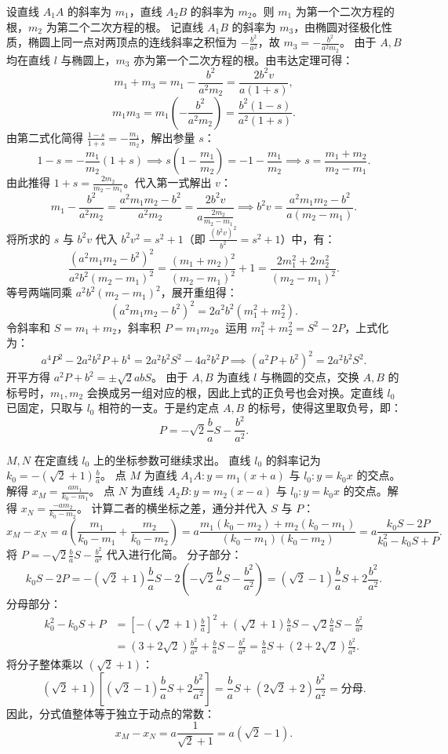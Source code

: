 \begin{solution}
设直线 $A_1A$ 的斜率为 $m_1$，直线 $A_2B$ 的斜率为 $m_2$。则 $m_1$ 为第一个二次方程的根，$m_2$ 为第二个二次方程的根。
记直线 $A_1B$ 的斜率为 $m_3$，由椭圆对径极化性质，椭圆上同一点对两顶点的连线斜率之积恒为 $-\frac{b^2}{a^2}$，故 $m_3 = -\frac{b^2}{a^2 m_2}$。
由于 $A, B$ 均在直线 $l$ 与椭圆上，$m_3$ 亦为第一个二次方程的根。由韦达定理可得：
\[ m_1 + m_3 = m_1 - \frac{b^2}{a^2 m_2} = \frac{2b^2 v}{a(1+s)}, \]
\[ m_1 m_3 = m_1 \left( -\frac{b^2}{a^2 m_2} \right) = \frac{b^2(1-s)}{a^2(1+s)}. \]
由第二式化简得 $\frac{1-s}{1+s} = -\frac{m_1}{m_2}$，解出参量 $s$：
\[ 1-s = -\frac{m_1}{m_2}(1+s) \implies s\left(1 - \frac{m_1}{m_2}\right) = -1 - \frac{m_1}{m_2} \implies s = \frac{m_1 + m_2}{m_2 - m_1}. \]
由此推得 $1+s = \frac{2m_2}{m_2 - m_1}$。代入第一式解出 $v$：
\[ m_1 - \frac{b^2}{a^2 m_2} = \frac{a^2 m_1 m_2 - b^2}{a^2 m_2} = \frac{2b^2 v}{a \frac{2m_2}{m_2 - m_1}} \implies b^2 v = \frac{a^2 m_1 m_2 - b^2}{a(m_2 - m_1)}. \]
将所求的 $s$ 与 $b^2 v$ 代入 $b^2 v^2 = s^2 + 1$（即 $\frac{(b^2 v)^2}{b^2} = s^2 + 1$）中，有：
\[ \frac{(a^2 m_1 m_2 - b^2)^2}{a^2 b^2 (m_2 - m_1)^2} = \frac{(m_1 + m_2)^2}{(m_2 - m_1)^2} + 1 = \frac{2m_1^2 + 2m_2^2}{(m_2 - m_1)^2}. \]
等号两端同乘 $a^2 b^2 (m_2 - m_1)^2$，展开重组得：
\[ (a^2 m_1 m_2 - b^2)^2 = 2a^2 b^2 (m_1^2 + m_2^2). \]
令斜率和 $S = m_1 + m_2$，斜率积 $P = m_1 m_2$。运用 $m_1^2 + m_2^2 = S^2 - 2P$，上式化为：
\[ a^4 P^2 - 2a^2 b^2 P + b^4 = 2a^2 b^2 S^2 - 4a^2 b^2 P \implies (a^2 P + b^2)^2 = 2a^2 b^2 S^2. \]
开平方得 $a^2 P + b^2 = \pm \sqrt{2} a b S$。
由于 $A, B$ 为直线 $l$ 与椭圆的交点，交换 $A, B$ 的标号时，$m_1,m_2$ 会换成另一组对应的根，因此上式的正负号也会对换。定直线 $l_0$ 已固定，只取与 $l_0$ 相符的一支。于是约定点 $A, B$ 的标号，使得这里取负号，即：
\[ P = -\sqrt{2}\frac{b}{a}S - \frac{b^2}{a^2}. \]

$M, N$ 在定直线 $l_0$ 上的坐标参数可继续求出。
直线 $l_0$ 的斜率记为 $k_0 = -(\sqrt{2}+1)\frac{b}{a}$。
点 $M$ 为直线 $A_1A: y = m_1(x+a)$ 与 $l_0: y = k_0 x$ 的交点。解得 $x_M = \frac{a m_1}{k_0 - m_1}$。
点 $N$ 为直线 $A_2B: y = m_2(x-a)$ 与 $l_0: y = k_0 x$ 的交点。解得 $x_N = \frac{-a m_2}{k_0 - m_2}$。
计算二者的横坐标之差，通分并代入 $S$ 与 $P$：
\[ x_M - x_N = a \left( \frac{m_1}{k_0 - m_1} + \frac{m_2}{k_0 - m_2} \right) = a \frac{m_1(k_0 - m_2) + m_2(k_0 - m_1)}{(k_0 - m_1)(k_0 - m_2)} = a \frac{k_0 S - 2P}{k_0^2 - k_0 S + P}. \]
将 $P = -\sqrt{2}\frac{b}{a}S - \frac{b^2}{a^2}$ 代入进行化简。
分子部分：
\[ k_0 S - 2P = -(\sqrt{2}+1)\frac{b}{a}S - 2\left(-\sqrt{2}\frac{b}{a}S - \frac{b^2}{a^2}\right) = (\sqrt{2}-1)\frac{b}{a}S + 2\frac{b^2}{a^2}. \]
分母部分：
\begin{align*}
k_0^2 - k_0 S + P &= \left[-(\sqrt{2}+1)\frac{b}{a}\right]^2 + (\sqrt{2}+1)\frac{b}{a}S - \sqrt{2}\frac{b}{a}S - \frac{b^2}{a^2} \\
&= (3+2\sqrt{2})\frac{b^2}{a^2} + \frac{b}{a}S - \frac{b^2}{a^2} = \frac{b}{a}S + (2+2\sqrt{2})\frac{b^2}{a^2}.
\end{align*}
将分子整体乘以 $(\sqrt{2}+1)$：
\[ (\sqrt{2}+1) \left[ (\sqrt{2}-1)\frac{b}{a}S + 2\frac{b^2}{a^2} \right] = \frac{b}{a}S + (2\sqrt{2}+2)\frac{b^2}{a^2} = \text{分母}. \]
因此，分式值整体等于独立于动点的常数：
\[ x_M - x_N = a \frac{1}{\sqrt{2}+1} = a(\sqrt{2}-1). \]


\end{solution}
